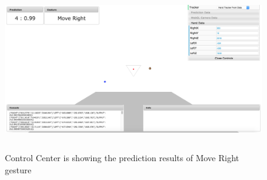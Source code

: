 \begin{figure}
	[h] \centering 
	\includegraphics[height=70mm]{figures/result/cc-move-right.jpg} \caption{Control Center is showing the prediction results of Move Right gesture}
	\label{res:cc:move:right} 
\end{figure}

